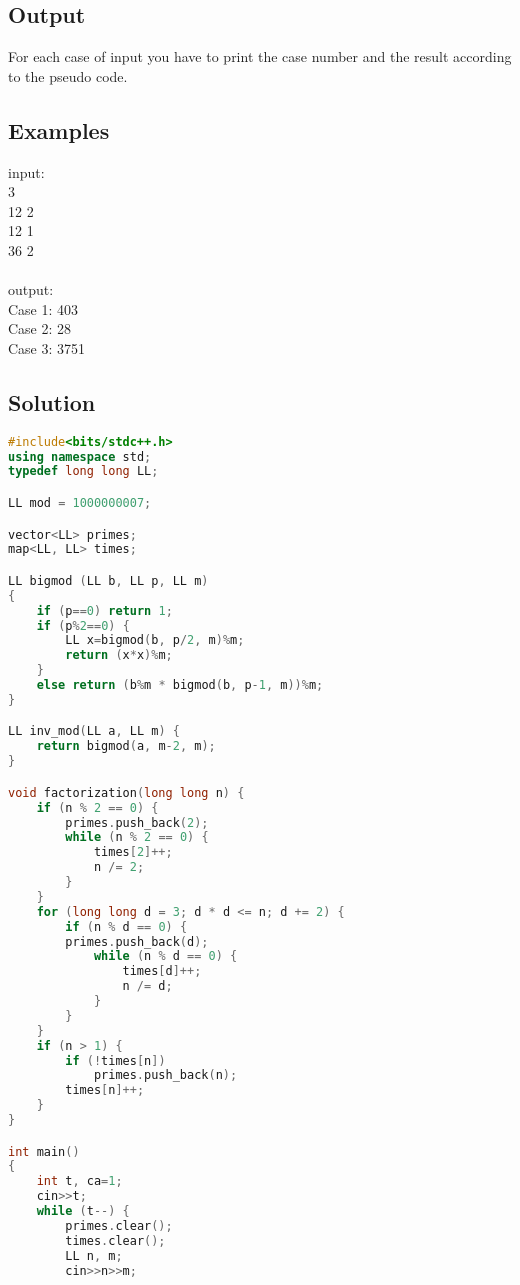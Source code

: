 \documentclass[10pt,a4paper]{article}
\begin{document}
\begin{itemize}
\subsection*{Output}
For each case of input you have to print the case number and the result according to the pseudo code.

\subsection*{Examples}
input: \\
3\\
12 2\\
12 1\\
36 2\\
\\
output: \\
Case 1: 403 \\
Case 2: 28 \\
Case 3: 3751 

\subsection*{Solution}

\begin{lstlisting}[language=C++, caption={Efficient Pseudo Code}, label={1st:code}, mathescape=true, breaklines=true]
#include<bits/stdc++.h>
using namespace std;
typedef long long LL;

LL mod = 1000000007;

vector<LL> primes;
map<LL, LL> times;

LL bigmod (LL b, LL p, LL m)
{
    if (p==0) return 1;
    if (p%2==0) {
        LL x=bigmod(b, p/2, m)%m;
        return (x*x)%m;
    }
    else return (b%m * bigmod(b, p-1, m))%m;
}

LL inv_mod(LL a, LL m) {
    return bigmod(a, m-2, m);
}

void factorization(long long n) {
    if (n % 2 == 0) {
        primes.push_back(2);
        while (n % 2 == 0) {
            times[2]++;
            n /= 2;
        }
    }
    for (long long d = 3; d * d <= n; d += 2) { 
        if (n % d == 0) {
        primes.push_back(d);
            while (n % d == 0) {
                times[d]++;
                n /= d;
            }
        }
    }
    if (n > 1) {
        if (!times[n])
            primes.push_back(n);
        times[n]++;
    }
}

int main()
{
    int t, ca=1;
    cin>>t;
    while (t--) {
        primes.clear();
        times.clear();
        LL n, m;
        cin>>n>>m;


\end{lstlisting}
\end{itemize}
\end{document}
